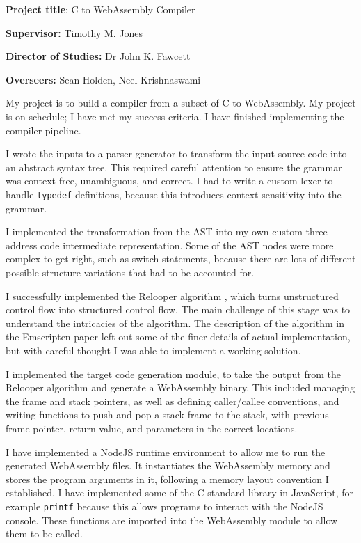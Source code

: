 \documentclass[12pt, a4paper]{article}
\begin{document}
\textbf{Project title}: C to WebAssembly Compiler

\textbf{Supervisor:} Timothy M. Jones

\textbf{Director of Studies:} Dr John K. Fawcett

\textbf{Overseers:} Sean Holden, Neel Krishnaswami

\vspace{3\parskip}

My project is to build a compiler from a subset of C to WebAssembly.
My project is on schedule; I have met my success criteria. I have finished implementing the compiler pipeline.

I wrote the inputs to a parser generator to transform the input source code into an abstract syntax tree.
This required careful attention to ensure the grammar was context-free, unambiguous, and correct.
I had to write a custom lexer to handle \texttt{typedef} definitions, because this introduces context-sensitivity into the grammar.

I implemented the transformation from the AST into my own custom three-address code intermediate representation.
Some of the AST nodes were more complex to get right, such as switch statements, because there are lots of different possible structure variations that had to be accounted for.

I successfully implemented the Relooper algorithm \cite{emscripten}, which turns unstructured control flow into structured control flow.
The main challenge of this stage was to understand the intricacies of the algorithm. The description of the algorithm in the Emscripten paper left out some of the finer details of actual implementation, but with careful thought I was able to implement a working solution.

I implemented the target code generation module, to take the output from the Relooper algorithm and generate a WebAssembly binary.
This included managing the frame and stack pointers, as well as defining caller/callee conventions, and writing functions to push and pop a stack frame to the stack, with previous frame pointer, return value, and parameters in the correct locations.

I have implemented a NodeJS runtime environment to allow me to run the generated WebAssembly files.
It instantiates the WebAssembly memory and stores the program arguments in it, following a memory layout convention I established.
I have implemented some of the C standard library in JavaScript, for example \texttt{printf} because this allows programs to interact with the NodeJS console. These functions are imported into the WebAssembly module to allow them to be called.
\end{document}
